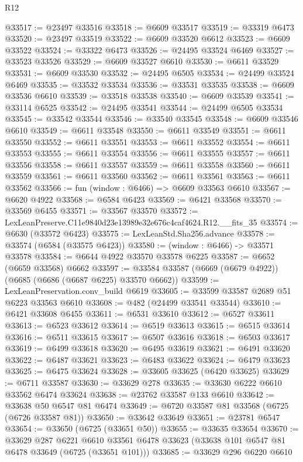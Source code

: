 \begin{lexlean}{R12}
\begin{coremodule}
@33517 := @23497 @33516
@33518 := @6609 @33517
@33519 := @33319 @6473
@33520 := @23497 @33519
@33522 := @6609 @33520 @6612
@33523 := @6609 @33522
@33524 := @33322 @6473
@33526 := @24495 @33524 @6469
@33527 := @33523 @33526
@33529 := @6609 @33527 @6610
@33530 := @6611 @33529
@33531 := @6609 @33530
@33532 := @24495 @6505
@33534 := @24499 @33524 @6469
@33535 := @33532 @33534
@33536 := @33531 @33535
@33538 := @6609 @33536 @6610
@33539 := @33518 @33538
@33540 := @6609 @33539
@33541 := @33114 @6525
@33542 := @24495 @33541
@33544 := @24499 @6505 @33534
@33545 := @33542 @33544
@33546 := @33540 @33545
@33548 := @6609 @33546 @6610
@33549 := @6611 @33548
@33550 := @6611 @33549
@33551 := @6611 @33550
@33552 := @6611 @33551
@33553 := @6611 @33552
@33554 := @6611 @33553
@33555 := @6611 @33554
@33556 := @6611 @33555
@33557 := @6611 @33556
@33558 := @6611 @33557
@33559 := @6611 @33558
@33560 := @6611 @33559
@33561 := @6611 @33560
@33562 := @6611 @33561
@33563 := @6611 @33562
@33566 := fun (window : @6466) => @6609 @33563 @6610
@33567 := @6620 @4922
@33568 := @6584 @6423
@33569 := @6421 @33568
@33570 := @33569 @6455
@33571 := @33567 @33570
@33572 := LexLeanPreserve.C11e9840d23e13989e32e676c4caf4624.R12.__fits_35
@33574 := @6630 (@33572 @6423)
@33575 := LexLeanStd.Sha256.advance
@33578 := @33574 (@6584 (@33575 @6423))
@33580 := (window : @6466) -> @33571 @33578
@33584 := @6644 @4922 @33570 @33578 @6225
@33587 := @6652 (@6659 @33568) @6662
@33597 := @33584 @33587 (@6669 (@6679 @4922)) (@6685 (@6686 (@6687 @6225) @33570 @6662))
@33599 := LexLeanPreservation.conv_build @6619
@33605 := @33599 @33587 @2689 @51 @6223 @33563 @6610
@33608 := @482 (@24499 @33541 @33544)
@33610 := @6421 @33608 @6455
@33611 := @6531 @33610
@33612 := @6527 @33611
@33613 := @6523 @33612
@33614 := @6519 @33613
@33615 := @6515 @33614
@33616 := @6511 @33615
@33617 := @6507 @33616
@33618 := @6503 @33617
@33619 := @6499 @33618
@33620 := @6495 @33619
@33621 := @6491 @33620
@33622 := @6487 @33621
@33623 := @6483 @33622
@33624 := @6479 @33623
@33625 := @6475 @33624
@33628 := @33605 @33625 (@6420 @33625)
@33629 := @6711 @33587
@33630 := @33629 @278
@33635 := @33630 @6222 @6610 @33562 @6474 @33624
@33638 := @23762 @33587 @133 @6610
@33642 := @33638 @50 @6547 @81 @6474
@33649 := @6720 @33587 @81 @33568 (@6725 (@6726 @33587 @81))
@33650 := @33642 @33649
@33651 := @23781 @6547
@33654 := @33650 (@6725 (@33651 @50))
@33655 := @33635 @33654
@33670 := @33629
    @287
    @6221
    @6610
    @33561
    @6478
    @33623
    (@33638 @101 @6547 @81 @6478 @33649 (@6725 (@33651 @101)))
@33685 := @33629
    @296
    @6220
    @6610

\end{coremodule}
\end{lexlean}
